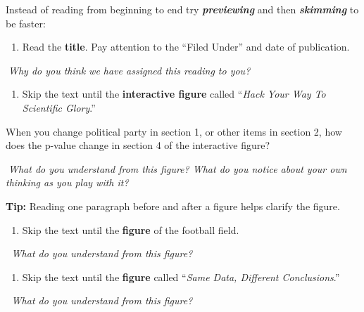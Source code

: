 \documentclass[
  openany]{book}
\providecommand{\tightlist}{%
  \setlength{\itemsep}{0pt}\setlength{\parskip}{0pt}}
\begin{document}
Instead of reading from beginning to end try \textbf{\emph{previewing}} and then \textbf{\emph{skimming}} to be faster:

\begin{enumerate}
\def\labelenumi{\arabic{enumi}.}
\tightlist
\item
  Read the \textbf{title}. Pay attention to the ``Filed Under'' and date of publication.
\end{enumerate}

🤔\emph{Why do you think we have assigned this reading to you?}

\begin{enumerate}
\def\labelenumi{\arabic{enumi}.}
\setcounter{enumi}{1}
\tightlist
\item
  Skip the text until the \textbf{interactive figure} called ``\emph{Hack Your Way To Scientific Glory}.''
\end{enumerate}

When you change political party in section 1, or other items in section 2, how does the p-value change in section 4 of the interactive figure?

🤔\emph{What do you understand from this figure? What do you notice about your own thinking as you play with it?}

\textbf{Tip:} Reading one paragraph before and after a figure helps clarify the figure.

\begin{enumerate}
\def\labelenumi{\arabic{enumi}.}
\setcounter{enumi}{2}
\tightlist
\item
  Skip the text until the \textbf{figure} of the football field.
\end{enumerate}

🤔 \emph{What do you understand from this figure?}

\begin{enumerate}
\def\labelenumi{\arabic{enumi}.}
\setcounter{enumi}{3}
\tightlist
\item
  Skip the text until the \textbf{figure} called ``\emph{Same Data, Different Conclusions}.''
\end{enumerate}

🤔 \emph{What do you understand from this figure?}
\end{document}
